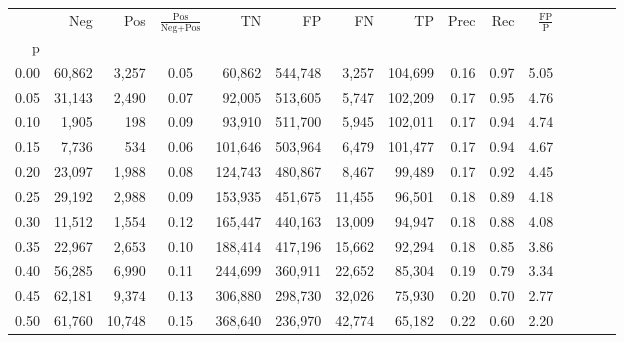 \begin{tabular}{rrrcrrrrrrrrrrr}
\toprule
{} &     Neg &     Pos & $\frac{\text{Pos}}{\text{Neg}+\text{Pos}}$ &       TN &       FP &       FN &       TP &  Prec &   Rec & $\frac{\text{FP}}{\text{P}}$ \\
p    &         &         &                                            &          &          &          &          &       &       &                              \\
\midrule
0.00 &  60,862 &   3,257 &                                       0.05 &   60,862 &  544,748 &    3,257 &  104,699 &  0.16 &  0.97 &                         5.05 \\
0.05 &  31,143 &   2,490 &                                       0.07 &   92,005 &  513,605 &    5,747 &  102,209 &  0.17 &  0.95 &                         4.76 \\
0.10 &   1,905 &     198 &                                       0.09 &   93,910 &  511,700 &    5,945 &  102,011 &  0.17 &  0.94 &                         4.74 \\
0.15 &   7,736 &     534 &                                       0.06 &  101,646 &  503,964 &    6,479 &  101,477 &  0.17 &  0.94 &                         4.67 \\
0.20 &  23,097 &   1,988 &                                       0.08 &  124,743 &  480,867 &    8,467 &   99,489 &  0.17 &  0.92 &                         4.45 \\
0.25 &  29,192 &   2,988 &                                       0.09 &  153,935 &  451,675 &   11,455 &   96,501 &  0.18 &  0.89 &                         4.18 \\
0.30 &  11,512 &   1,554 &                                       0.12 &  165,447 &  440,163 &   13,009 &   94,947 &  0.18 &  0.88 &                         4.08 \\
0.35 &  22,967 &   2,653 &                                       0.10 &  188,414 &  417,196 &   15,662 &   92,294 &  0.18 &  0.85 &                         3.86 \\
0.40 &  56,285 &   6,990 &                                       0.11 &  244,699 &  360,911 &   22,652 &   85,304 &  0.19 &  0.79 &                         3.34 \\
0.45 &  62,181 &   9,374 &                                       0.13 &  306,880 &  298,730 &   32,026 &   75,930 &  0.20 &  0.70 &                         2.77 \\
0.50 &  61,760 &  10,748 &                                       0.15 &  368,640 &  236,970 &   42,774 &   65,182 &  0.22 &  0.60 &                         2.20 \\

\end{tabular}
